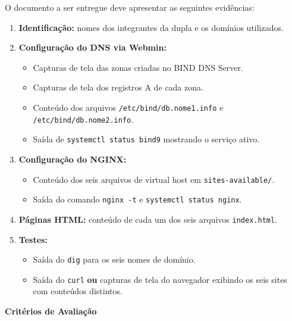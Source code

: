 \documentclass[11pt,a4paper]{article}
\begin{document}
O documento a ser entregue deve apresentar as seguintes evidências:

\begin{enumerate}
  \item \textbf{Identificação:} nomes dos integrantes da dupla e os domínios utilizados.
  \item \textbf{Configuração do DNS via Webmin:}
    \begin{itemize}
      \item Capturas de tela das zonas criadas no BIND DNS Server.
      \item Capturas de tela dos registros A de cada zona.
      \item Conteúdo dos arquivos \texttt{/etc/bind/db.nome1.info} e \texttt{/etc/bind/db.nome2.info}.
      \item Saída de \texttt{systemctl status bind9} mostrando o serviço ativo.
    \end{itemize}
  \item \textbf{Configuração do NGINX:}
    \begin{itemize}
      \item Conteúdo dos seis arquivos de virtual host em \texttt{sites-available/}.
      \item Saída do comando \texttt{nginx -t} e \texttt{systemctl status nginx}.
    \end{itemize}
  \item \textbf{Páginas HTML:} conteúdo de cada um dos seis arquivos \texttt{index.html}.
  \item \textbf{Testes:}
    \begin{itemize}
      \item Saída do \texttt{dig} para os seis nomes de domínio.
      \item Saída do \texttt{curl} \textbf{ou} capturas de tela do navegador exibindo os seis sites com conteúdos distintos.
    \end{itemize}
\end{enumerate}

\vspace{0.5em}
\begin{center}
  \Large\textbf{Critérios de Avaliação}
\end{center}
\end{document}

